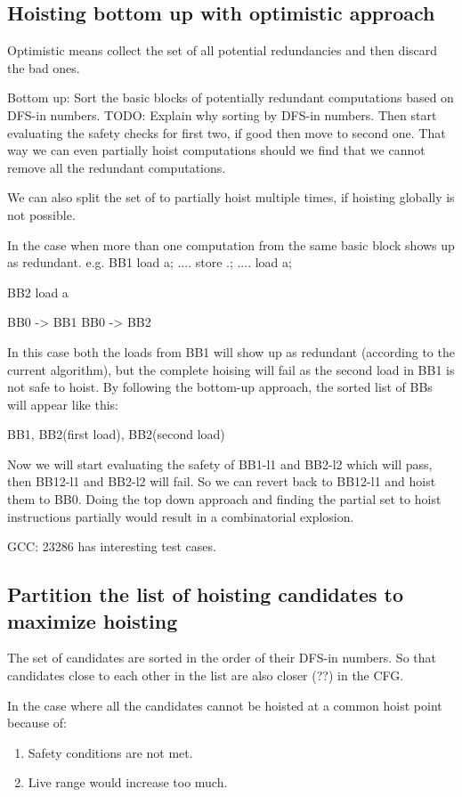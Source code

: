 \begin{section}
\section{Hoisting bottom up with optimistic approach}
Optimistic means collect the set of all potential redundancies and then discard the bad ones.

Bottom up:
Sort the basic blocks of potentially redundant computations based on DFS-in numbers.
TODO: Explain why sorting by DFS-in numbers.
Then start evaluating the safety checks for first two, if good then move to second one. That way we can even
partially hoist computations should we find that we cannot remove all the redundant computations.

We can also split the set of to partially hoist multiple times, if hoisting globally is not possible.

In the case when more than one computation from the same basic block shows up as redundant.
e.g.
BB1
load a;
....
store .;
....
load a;


BB2
load a

BB0 -> BB1
BB0 -> BB2

In this case both the loads from BB1 will show up as redundant (according to the current algorithm), but the complete
hoising will fail as the second load in BB1 is not safe to hoist. By following the bottom-up approach, the sorted list
of BBs will appear like this:

{ BB1, BB2(first load), BB2(second load) }

Now we will start evaluating the safety of BB1-l1 and BB2-l2 which will pass, then BB12-l1 and BB2-l2 will fail.
So we can revert back to BB12-l1 and hoist them to BB0. Doing the top down approach and finding the partial set
to hoist instructions partially would result in a combinatorial explosion.

GCC: 23286 has interesting test cases.

\section{Partition the list of hoisting candidates to maximize hoisting}
The set of candidates are sorted in the order of their DFS-in numbers. So that candidates close to
each other in the list are also closer (??) in the CFG.

In the case where all the candidates cannot be hoisted at a common hoist point because of:
\begin{enumerate}
\item Safety conditions are not met.
\item Live range would increase too much.
\end{enumerate}


\end{section}
